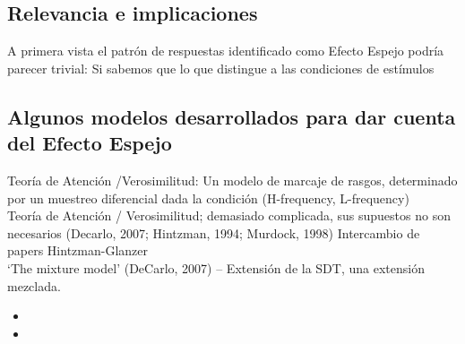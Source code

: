 \subsection{Relevancia e implicaciones}
A primera vista el patrón de respuestas identificado como Efecto Espejo podría parecer trivial: Si sabemos que lo que distingue a las condiciones de estímulos 

\subsection{Algunos modelos desarrollados para dar cuenta del Efecto Espejo}

Teoría de Atención /Verosimilitud: Un modelo de marcaje de rasgos, determinado por un muestreo diferencial dada la condición (H-frequency, L-frequency)\\
Teoría de Atención / Verosimilitud; demasiado complicada, sus supuestos no son necesarios (Decarlo, 2007; Hintzman, 1994; Murdock, 1998) Intercambio de papers Hintzman-Glanzer\\
‘The mixture model’ (DeCarlo, 2007) – Extensión de la SDT, una extensión mezclada.\\

\begin{itemize} 
\item
\item
\end{itemize}


